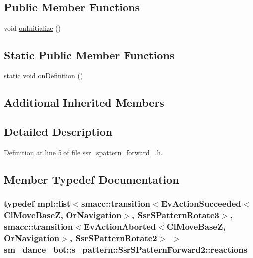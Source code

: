 \subsection*{Public Member Functions}
\begin{DoxyCompactItemize}
\item 
void \hyperlink{structsm__dance__bot_1_1s__pattern_1_1SsrSPatternForward2_a1b9ab7247efdae04ed85ab017a400a01}{on\+Initialize} ()
\end{DoxyCompactItemize}
\subsection*{Static Public Member Functions}
\begin{DoxyCompactItemize}
\item 
static void \hyperlink{structsm__dance__bot_1_1s__pattern_1_1SsrSPatternForward2_a85cd7d569fa295f163b5a3959e06d2ec}{on\+Definition} ()
\end{DoxyCompactItemize}
\subsection*{Additional Inherited Members}


\subsection{Detailed Description}


Definition at line 5 of file ssr\+\_\+spattern\+\_\+forward\+\_.\+h.



\subsection{Member Typedef Documentation}
\subsubsection[{\texorpdfstring{reactions}{reactions}}]{\setlength{\rightskip}{0pt plus 5cm}typedef mpl\+::list$<${\bf smacc\+::transition}$<$Ev\+Action\+Succeeded$<${\bf Cl\+Move\+BaseZ}, {\bf Or\+Navigation}$>$, {\bf Ssr\+S\+Pattern\+Rotate3}$>$, {\bf smacc\+::transition}$<$Ev\+Action\+Aborted$<${\bf Cl\+Move\+BaseZ}, {\bf Or\+Navigation}$>$, {\bf Ssr\+S\+Pattern\+Rotate2}$>$ $>$ {\bf sm\+\_\+dance\+\_\+bot\+::s\+\_\+pattern\+::\+Ssr\+S\+Pattern\+Forward2\+::reactions}}\hypertarget{structsm__dance__bot_1_1s__pattern_1_1SsrSPatternForward2_ad3469b0e397f305306984b8c6e144a3f}{}\label{structsm__dance__bot_1_1s__pattern_1_1SsrSPatternForward2_ad3469b0e397f305306984b8c6e144a3f}


